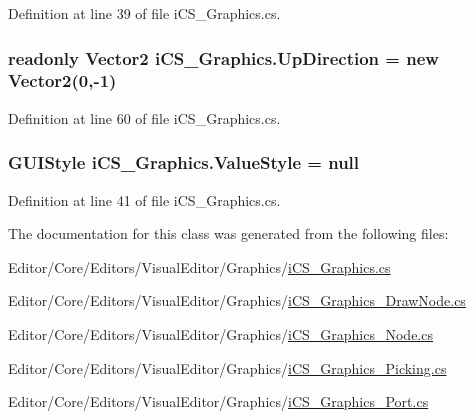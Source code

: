 Definition at line 39 of file i\+C\+S\+\_\+\+Graphics.\+cs.

\hypertarget{classi_c_s___graphics_a33f1f67c02a6d08490cddf8e4ff27aa3}{
\subsubsection[{Up\+Direction}]{\setlength{\rightskip}{0pt plus 5cm}readonly Vector2 i\+C\+S\+\_\+\+Graphics.\+Up\+Direction = new Vector2(0,-\/1)\hspace{0.3cm}{\ttfamily [static]}}}\label{classi_c_s___graphics_a33f1f67c02a6d08490cddf8e4ff27aa3}


Definition at line 60 of file i\+C\+S\+\_\+\+Graphics.\+cs.

\hypertarget{classi_c_s___graphics_a179b17c0a64bfca046b8d7f8e82cc3f0}{
\subsubsection[{Value\+Style}]{\setlength{\rightskip}{0pt plus 5cm}G\+U\+I\+Style i\+C\+S\+\_\+\+Graphics.\+Value\+Style = null}}\label{classi_c_s___graphics_a179b17c0a64bfca046b8d7f8e82cc3f0}


Definition at line 41 of file i\+C\+S\+\_\+\+Graphics.\+cs.



The documentation for this class was generated from the following files\+:\begin{DoxyCompactItemize}
\item 
Editor/\+Core/\+Editors/\+Visual\+Editor/\+Graphics/\hyperlink{i_c_s___graphics_8cs}{i\+C\+S\+\_\+\+Graphics.\+cs}\item 
Editor/\+Core/\+Editors/\+Visual\+Editor/\+Graphics/\hyperlink{i_c_s___graphics___draw_node_8cs}{i\+C\+S\+\_\+\+Graphics\+\_\+\+Draw\+Node.\+cs}\item 
Editor/\+Core/\+Editors/\+Visual\+Editor/\+Graphics/\hyperlink{i_c_s___graphics___node_8cs}{i\+C\+S\+\_\+\+Graphics\+\_\+\+Node.\+cs}\item 
Editor/\+Core/\+Editors/\+Visual\+Editor/\+Graphics/\hyperlink{i_c_s___graphics___picking_8cs}{i\+C\+S\+\_\+\+Graphics\+\_\+\+Picking.\+cs}\item 
Editor/\+Core/\+Editors/\+Visual\+Editor/\+Graphics/\hyperlink{i_c_s___graphics___port_8cs}{i\+C\+S\+\_\+\+Graphics\+\_\+\+Port.\+cs}\end{DoxyCompactItemize}
